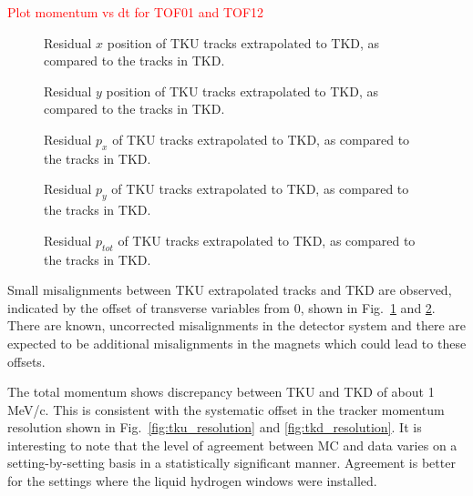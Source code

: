 \textcolor{red}{Plot momentum vs dt for TOF01 and TOF12}

\begin{figure}[!tbh]
    \centering
    {Residual $x$ position of TKU tracks extrapolated to TKD, as compared to the tracks in TKD. \label{fig:tkd_extrapolated_x}}
\end{figure}

\begin{figure}[!tbh]
    \centering
    {Residual $y$ position of TKU tracks extrapolated to TKD, as compared to the tracks in TKD. \label{fig:tkd_extrapolated_y}}
\end{figure}

\begin{figure}[!tbh]
    \centering
    {Residual $p_x$ of TKU tracks extrapolated to TKD, as compared to the tracks in TKD. \label{fig:tkd_extrapolated_px}}
\end{figure}

\begin{figure}[!tbh]
    \centering
    {Residual $p_y$ of TKU tracks extrapolated to TKD, as compared to the tracks in TKD. \label{fig:tkd_extrapolated_py}}
\end{figure}

\begin{figure}[!tbh]
    \centering
    {Residual $p_{tot}$ of TKU tracks extrapolated to TKD, as compared to the tracks in TKD. \label{fig:tkd_extrapolated_p}}
\end{figure}

Small misalignments between TKU extrapolated tracks and TKD are observed, 
indicated by the offset of transverse variables from 0, shown in 
Fig.~\ref{fig:tkd_extrapolated_x} and \ref{fig:tkd_extrapolated_y}. There are known, 
uncorrected misalignments in the detector system and there are expected to be 
additional misalignments in the magnets which could lead to these offsets.

The total momentum shows discrepancy between TKU and TKD of about 1 MeV/c. This
is consistent with the systematic offset in the tracker momentum resolution 
shown in Fig.~\ref{fig:tku_resolution} and \ref{fig:tkd_resolution}. It is
interesting to note that the level of agreement between MC and data varies
on a setting-by-setting basis in a statistically significant manner. Agreement
is better for the settings where the liquid hydrogen windows were installed.

